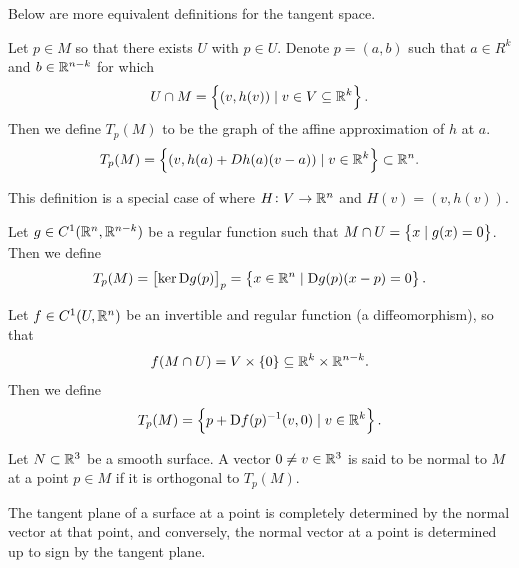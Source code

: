 \documentclass[11pt,a4paper]{article}
\begin{document}
\begin{remark}
  Below are more equivalent definitions for the tangent space.
\end{remark}

\begin{definition}
  Let $p \in M$ so that there exists $U$ with $p \in U$.
  Denote $p = (a,b)$ such that $a \in R^k$ and $b \in \mathbb{R}^{n-k}$
  for which
  \[
    U \cap M = \left\{(v,h(v)) \mid v \in V \subseteq \mathbb{R}^k\right\}.
  \]
  Then we define $T_p(M)$ to be the graph of the affine approximation
  of $h$ at $a$.
  \[
    T_p(M) = \left\{(v, h(a) + D h(a) (v - a)) \mid v \in \mathbb{R}^k\right\} \subset \mathbb{R}^n.
  \]
\end{definition}
\begin{remark}
  This definition is a special case of
  where $H \colon V \to \mathbb{R}^n$ and $H(v) = (v,h(v))$.
\end{remark}

\begin{definition}
  Let $g \in C^1(\mathbb{R}^n,\mathbb{R}^{n-k})$ be a regular function such that
  $M \cap U = \left\{x \mid g(x) = 0\right\}$.
  Then we define
  \[
    T_p(M) =
    \left[\ker \mathrm{D} g(p)\right]_p =
    \left\{x \in \mathbb{R}^n \mid \mathrm{D} g(p)(x - p) = 0\right\}.
  \]
\end{definition}

\begin{definition}
  Let $f \in C^1(U,\mathbb{R}^n)$ be an invertible and regular function
  (a diffeomorphism), so that
  \[
    f(M \cap U) = V \times \left\{0\right\} \subseteq \mathbb{R}^k \times \mathbb{R}^{n-k}.
  \]
  Then we define
  \[
    T_p(M) = \left\{p + \mathrm{D} f(p)^{-1}(v,0) \mid v \in \mathbb{R}^{k}\right\}.
  \]
\end{definition}


\begin{definition}[Normal]
  \label{def:normal}
  Let $N \subset \mathbb{R}^3$ be a smooth surface.
  A vector $0 \neq v \in \mathbb{R}^3$ is said to be normal to $M$ at a 
  point $p \in M$ if it is orthogonal to $T_p(M)$.
\end{definition}

\begin{remark}
  The tangent plane of a surface at a point is completely determined
  by the normal vector at that point,
  and conversely, the normal vector at a point is determined up to sign
  by the tangent plane.
\end{remark}
\end{document}
